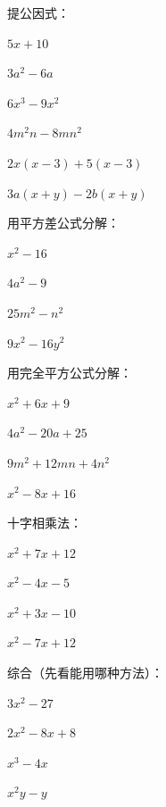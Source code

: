 \begin{exercise}
\item 提公因式：
  \begin{subexercise}
    \item $5x+10$
    \item $3a^2-6a$
    \item $6x^3-9x^2$
    \item $4m^2n-8mn^2$
    \item $2x(x-3)+5(x-3)$
    \item $3a(x+y)-2b(x+y)$
  \end{subexercise}

\item 用平方差公式分解：
  \begin{subexercise}
    \item $x^2-16$
    \item $4a^2-9$
    \item $25m^2-n^2$
    \item $9x^2-16y^2$
  \end{subexercise}

\item 用完全平方公式分解：
  \begin{subexercise}
    \item $x^2+6x+9$
    \item $4a^2-20a+25$
    \item $9m^2+12mn+4n^2$
    \item $x^2-8x+16$
  \end{subexercise}

\item 十字相乘法：
  \begin{subexercise}
    \item $x^2+7x+12$
    \item $x^2-4x-5$
    \item $x^2+3x-10$
    \item $x^2-7x+12$
  \end{subexercise}

\item 综合（先看能用哪种方法）：
  \begin{subexercise}
    \item $3x^2-27$
    \item $2x^2-8x+8$
    \item $x^3-4x$
    \item $x^2y-y$
  \end{subexercise}
\end{exercise}

